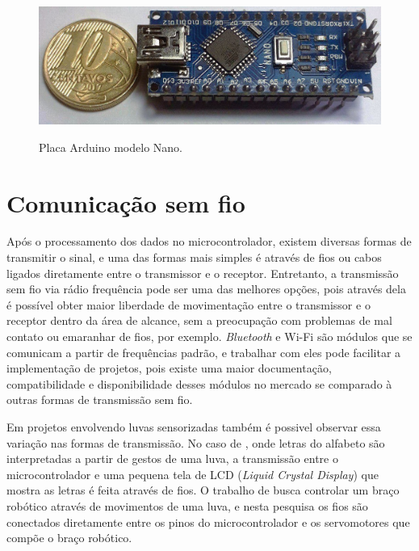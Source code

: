 \documentclass[
	12pt,				%
	openright,			%
	oneside,			%
	a4paper,			%
	english,			%
	brazil				%
	]{abntex2}
\begin{document}
		\begin{figure}[h!]
			\centering
			\caption{Placa Arduino modelo Nano.}
  		\includegraphics[width=12cm]{./figures/arduino-nano1.jpg}
  		\label{Fig:arduino-nano1}
		\end{figure}



	


		\section{Comunicação sem fio}
		
		Após o processamento dos dados no microcontrolador, existem diversas formas de transmitir o sinal, e uma das formas mais simples é através de fios ou cabos ligados diretamente entre o transmissor e o receptor. Entretanto, a transmissão sem fio via rádio frequência pode ser uma das melhores opções, pois através dela é possível obter maior liberdade de movimentação entre o transmissor e o receptor dentro da área de alcance, sem a preocupação com problemas de mal contato ou emaranhar de fios, por exemplo. \textit{Bluetooth} e Wi-Fi são módulos que se comunicam a partir de frequências padrão, e trabalhar com eles pode facilitar a implementação de projetos, pois existe uma maior documentação, compatibilidade e disponibilidade desses módulos no mercado se comparado à outras formas de transmissão sem fio.
		
		Em projetos envolvendo luvas sensorizadas também é possivel observar essa variação nas formas de transmissão. No caso de \cite{solanki2013sign}, onde letras do alfabeto são interpretadas a partir de gestos de uma luva, a transmissão entre o microcontrolador e uma pequena tela de LCD (\textit{Liquid Crystal Display})  que mostra as letras é feita através de fios. O trabalho de \cite{syed2012armcontroller} busca controlar um braço robótico através de movimentos de uma luva, e nesta pesquisa os fios são conectados diretamente entre os pinos do microcontrolador e os servomotores que compõe o braço robótico.
\end{document}
